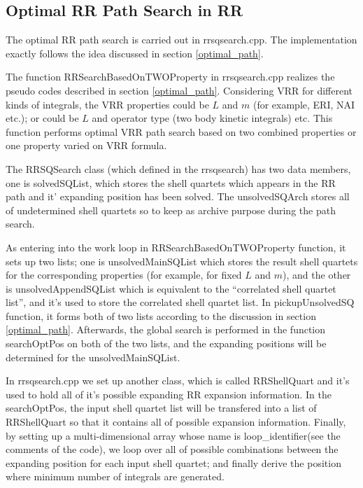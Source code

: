 \subsection{Optimal RR Path Search in RR}
\label{rrsqsearch}

The optimal RR path search is carried out in rrsqsearch.cpp. The implementation 
exactly follows the idea discussed in section \ref{optimal_path}.

The function RRSearchBasedOnTWOProperty in rrsqsearch.cpp realizes the pseudo codes
described in section \ref{optimal_path}. Considering VRR for different kinds of 
integrals, the VRR properties could be $L$ and $m$ (for example, ERI, NAI etc.);
or could be $L$ and operator type (two body kinetic integrals) etc. This function
performs optimal VRR path search based on two combined properties or one property
varied on VRR formula. 

The RRSQSearch class (which defined in the rrsqsearch) has two data members, one 
is solvedSQList, which stores the shell quartets which appears in the RR path and 
it' expanding position has been solved. The unsolvedSQArch stores all of undetermined
shell quartets so to keep as archive purpose during the path search.

As entering into the work loop in RRSearchBasedOnTWOProperty function, it sets up
two lists; one is unsolvedMainSQList which stores the result shell quartets for 
the corresponding properties (for example, for fixed $L$ and $m$), and the other
is unsolvedAppendSQList which is equivalent to the ``correlated shell quartet list'',
and it's used to store the correlated shell quartet list. In pickupUnsolvedSQ 
function, it forms both of two lists according to the discussion in section 
\ref{optimal_path}. Afterwards, the global search is performed in the function 
searchOptPos on both of the two lists, and the expanding positions will be determined
for the unsolvedMainSQList.

In rrsqsearch.cpp we set up another class, which is called RRShellQuart and it's 
used to hold all of it's possible expanding RR expansion information. In the 
searchOptPos, the input shell quartet list will be transfered into a list of 
RRShellQuart so that it contains all of possible expansion information. Finally,
by setting up a multi-dimensional array whose name is loop\_identifier(see the 
comments of the code), we loop over all of possible combinations between the 
expanding position for each input shell quartet; and finally derive the position
where minimum number of integrals are generated.

